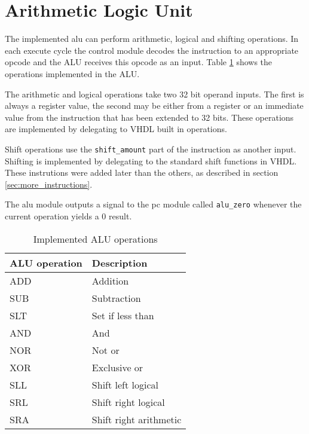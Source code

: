 \section{Arithmetic Logic Unit}
The implemented \gls{alu} can perform arithmetic, logical and shifting operations.
In each execute cycle the control module decodes the instruction to an appropriate opcode and the ALU receives this opcode as an input.
Table \ref{table:alu_ops} shows the operations implemented in the ALU.

The arithmetic and logical operations take two 32 bit operand inputs.
The first is always a register value,
the second may be either from a register or an immediate value from the instruction that has been extended to 32 bits.
These operations are implemented by delegating to VHDL built in operations.

Shift operations use the \texttt{shift\_amount} part of the instruction as another input.
Shifting is implemented by delegating to the standard shift functions in VHDL.
These instrutions were added later than the others,
as described in section \ref{sec:more_instructions}.

The \gls{alu} module outputs a signal to the \gls{pc} module called \texttt{alu\_zero} whenever the current operation yields a 0 result.

\begin{table}[h]
    \centering
    \begin{tabular}{ |l|l| }
        \hline
        ALU operation & Description             \\ \hline
        ADD           & Addition                \\
        SUB           & Subtraction             \\
        SLT           & Set if less than        \\
        AND           & And                     \\
        NOR           & Not or                  \\
        XOR           & Exclusive or            \\
        SLL           & Shift left logical      \\
        SRL           & Shift right logical     \\
        SRA           & Shift right arithmetic  \\
        \hline
    \end{tabular}
    \caption{Implemented ALU operations}
    \label{table:alu_ops}
\end{table}

